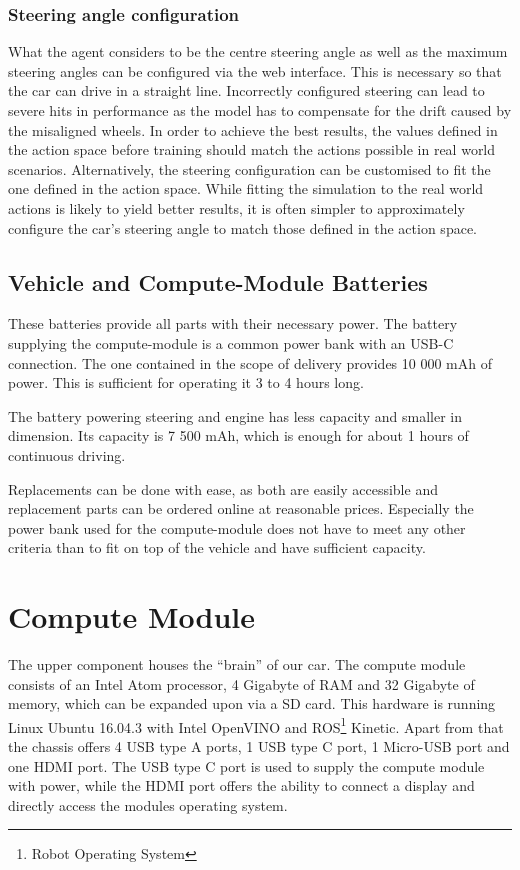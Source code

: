 \subsubsection{Steering angle configuration}
What the agent considers to be the centre steering angle as well as the maximum steering angles can be configured via the web interface. This is necessary so that the car can drive in a straight line. Incorrectly configured steering can lead to severe hits in performance as the model has to compensate for the drift caused by the misaligned wheels. In order to achieve the best results, the values defined in the action space before training should match the actions possible in real world scenarios. Alternatively, the steering configuration can be customised to fit the one defined in the action space. While fitting the simulation to the real world actions is likely to yield better results, it is often simpler to approximately configure the car's steering angle to match those defined in the action space.

\subsection{Vehicle and Compute-Module Batteries}
These batteries provide all parts with their necessary power. The battery supplying the compute-module is a common power bank with an USB-C connection. The one contained in the scope of delivery provides 10 000 mAh of power. This is sufficient for operating it 3 to 4 hours long. 

The battery powering steering and engine has less capacity and smaller in dimension. Its capacity is 7 500 mAh, which is enough for about 1 hours of continuous driving.

Replacements can be done with ease, as both are easily accessible and replacement parts can be ordered online at reasonable prices. Especially the power bank used for the compute-module does not have to meet any other criteria than to fit on top of the vehicle and have sufficient capacity.

\section{Compute Module}
The upper component houses the ``brain'' of our car. The compute module consists of an Intel Atom
processor, 4 Gigabyte of RAM and 32 Gigabyte of memory, which can be expanded upon via a SD card. This hardware is running Linux Ubuntu 16.04.3 with Intel OpenVINO\texttrademark{} and ROS\footnote{Robot Operating System} Kinetic. Apart from that the chassis offers 4 USB type A ports, 1 USB type C port, 1 Micro-USB port and one HDMI port. The USB type C port is used to supply the compute module with power, while the HDMI port offers the ability to connect a display and directly access the modules operating system.

